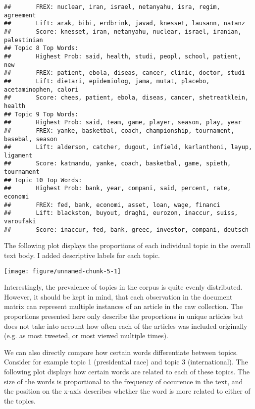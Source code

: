 \documentclass[12pt]{article}
\begin{document}
\begin{doublespace}
\begin{knitrout}
\begin{kframe}
\begin{verbatim}
##  	 FREX: nuclear, iran, israel, netanyahu, isra, regim, agreement 
##  	 Lift: arak, bibi, erdbrink, javad, knesset, lausann, natanz 
##  	 Score: knesset, iran, netanyahu, nuclear, israel, iranian, palestinian 
## Topic 8 Top Words:
##  	 Highest Prob: said, health, studi, peopl, school, patient, new 
##  	 FREX: patient, ebola, diseas, cancer, clinic, doctor, studi 
##  	 Lift: dietari, epidemiolog, jama, mutat, placebo, acetaminophen, calori 
##  	 Score: chees, patient, ebola, diseas, cancer, shetreatklein, health 
## Topic 9 Top Words:
##  	 Highest Prob: said, team, game, player, season, play, year 
##  	 FREX: yanke, basketbal, coach, championship, tournament, basebal, season 
##  	 Lift: alderson, catcher, dugout, infield, karlanthoni, layup, ligament 
##  	 Score: katmandu, yanke, coach, basketbal, game, spieth, tournament 
## Topic 10 Top Words:
##  	 Highest Prob: bank, year, compani, said, percent, rate, economi 
##  	 FREX: fed, bank, economi, asset, loan, wage, financi 
##  	 Lift: blackston, buyout, draghi, eurozon, inaccur, suiss, varoufaki 
##  	 Score: inaccur, fed, bank, greec, investor, compani, deutsch
\end{verbatim}
\end{kframe}
\end{knitrout}

The following plot displays the proportions of each individual topic in the overall text body. I added descriptive labels for each topic.

\begin{knitrout}
\color{fgcolor}
\texttt{[image: figure/unnamed-chunk-5-1]} 

\end{knitrout}

Interestingly, the prevalence of topics in the corpus is quite evenly distributed. However, it should be kept in mind, that each observation in the document matrix can represent multiple instances of an article in the raw collection. The proportions presented here only describe the proportions in unique articles but does not take into account how often each of the articles was included originally (e.g. as most tweeted, or most viewed multiple times). 

We can also directly compare how certain words differentiate between topics. Consider for example topic 1 (presidential race) and topic 3 (international). The following plot displays how certain words are related to each of these topics. The size of the words is proportional to the frequency of occurence in the text, and the position on the x-axis describes whether the word is more related to either of the topics.


\end{doublespace}
\end{document}
